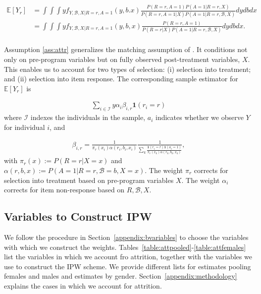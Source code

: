 \begin{align*} \label{eq:case2ipw}
\mathbb{E}[Y_r] & = \int \int \int y f_{Y,\mathcal{B},X|R=r,A=1}(y,b.x) \frac{P(R=r,A=1) P(A=1|R=r,X)}{P(R=r,A=1|X) P(A=1|R=r,\mathcal{B},X)} dydbdx \\
	            & = \int \int  \int y f_{Y,\mathcal{B},X|R=r,A=1}(y,b,x) \frac{P(R=r,A=1)}{P(R=r|X) P(A=1|R=r,\mathcal{B},X)} dydbdx. \\
\end{align*}

\noindent Assumption \ref{ass:attr} generalizes the matching assumption of \citet{Campbell_Conti_etal_2014_EarlyChildhoodInvestments}. It conditions not only on pre-program variables but on fully observed post-treatment variables, $X$. This enables us to account for two types of selection:  (i) selection into treatment; and (ii) selection into item response. The corresponding sample estimator for $\mathbb{E}[Y_r]$ is

\begin{align*}
\sum_{i \in \mathcal{I}} y \alpha_{i} \beta_{i,r} \mathbf{1}(r_i = r)
\end{align*}
\noindent where $\mathcal{I}$ indexes the individuals in the sample, $a_i$ indicates whether we observe $Y$ for individual $i$, and

\begin{align*}
	\beta_{i,r} = \frac{1}{\pi_r(x_i) \alpha(r_i,b_i,x_i)} \frac{1}{\sum_k{\frac{\mathbf{1}(r_i = r) \mathbf{1}(a_i = 1)}{\pi_r(x_k)\alpha(r_k,b_k,x_k)}}},
\end{align*}
\noindent with $\pi_r(x) := P(R=r|X=x)$ and $\alpha(r,b,x) := P(A=1|R=r,\mathcal{B}=b,X=x)$. The weight $\pi_r$ corrects for selection into treatment based on pre-program variables $X$. The weight $\alpha_{i}$ corrects for item non-response based on $R, \mathcal{B}, X$.\\

\subsection{Variables to Construct IPW}

\noindent We follow the procedure in Section~\ref{appendix:bvariables} to choose the variables with which we construct the weights. Tables~\ref{table:attpooled}-\ref{table:attfemales} list the variables in which we account fro attrition, together with the variables we use to construct the IPW scheme. We provide different lists for estimates pooling females and males and estimates by gender. Section~\ref{appendix:methodology} explains the cases in which we account for attrition.

